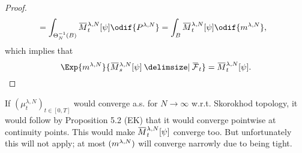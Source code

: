 \begin{proof}
\begin{equation}
\begin{split}
       & = \int_{\Theta_N^{-1}(B)} \ol{M}_t^{\lambda, N}[\psi] \odif{P^{\lambda, N}} %
      = \int_B \ol{M}_t^{\lambda, N}[\psi] \odif{\lawmu^{\lambda,N}},
    \end{split}
  \end{equation}
  which implies that
  \begin{equation}
    \Exp{\lawmu^{\lambda,N}}{\ol{M}_{s}^{\lambda, N}[\psi] \given \ol{\cF}_t} = \ol{M}_t^{\lambda, N}[\psi].
  \end{equation}
\end{proof}


If \((\mu_t^{\lambda, N})_{t\in[0,T]}\) would converge a.s. for \(N\to\infty\) w.r.t. Skorokhod topology, it would follow by Proposition 5.2 (EK) that it would converge pointwise at continuity points.
This would make \(\ol{M}_t^{\lambda, N}[\psi]\) converge too.
But unfortunately this will not apply; at most \((m^{\lambda,N})\) will converge narrowly due to being tight.
